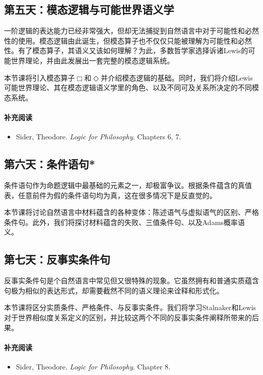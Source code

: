 \documentclass{article}
\begin{document}
\subsection*{第五天：模态逻辑与可能世界语义学}

一阶逻辑的表达能力已经非常强大，但却无法捕捉到自然语言中对于可能性和必然性的使用。模态逻辑由此诞生，但模态算子也不仅仅只能被理解为可能性和必然性。有了模态算子，其语义又该如何理解？为此，多数哲学家选择诉诸Lewis的可能世界理论，并由此发展出一套完整的模态逻辑系统。

本节课将引入模态算子$\Box$和$\Diamond$并介绍模态逻辑的基础。同时，我们将介绍Lewis可能世界理论、其在模态逻辑语义学里的角色、以及不同可及关系所决定的不同模态系统。

\paragraph*{补充阅读}
\begin{itemize}
  \item Sider, Theodore. \textit{Logic for Philosophy}. Chapters 6, 7.
\end{itemize}


\subsection*{第六天：条件语句*}

条件语句作为命题逻辑中最基础的元素之一，却极富争议。根据条件蕴含的真值表，任意前件为假的条件语句均为真，这在很多情况下是反直觉的。

本节课将讨论自然语言中材料蕴含的各种变体：陈述语气与虚拟语气的区别、严格条件句。此外，我们将探讨材料蕴含的失败、三值条件句、以及Adams概率语义。


\subsection*{第七天：反事实条件句}

反事实条件句是个自然语言中常见但又很特殊的现象。它虽然拥有和普通实质蕴含句极为相似的表达形式，却需要截然不同的语义理论来诠释和形式化。%

本节课将区分实质条件、严格条件、与反事实条件。我们将学习Stalnaker和Lewis对于世界相似度关系定义的区别，并比较这两个不同的反事实条件阐释所带来的后果。

\paragraph*{补充阅读}
\begin{itemize}
  \item Sider, Theodore. \textit{Logic for Philosophy}. Chapter 8.
\end{itemize}
\end{document}
